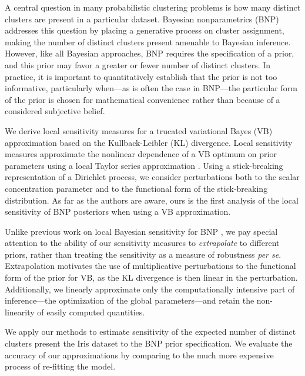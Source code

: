 
A central question in many probabilistic clustering problems is how many
distinct clusters are present in a particular dataset. Bayesian nonparametrics
(BNP) addresses this question by placing a generative process on cluster
assignment, making the number of distinct clusters present amenable to Bayesian
inference.  However, like all Bayesian approaches, BNP requires the
specification of a prior, and this prior may favor a greater or fewer number of
distinct clusters. In practice, it is important to quantitatively establish that
the prior is not too informative, particularly when---as is often the case in
BNP---the particular form of the prior is chosen for mathematical convenience
rather than because of a considered subjective belief.

We derive local sensitivity measures for a trucated variational Bayes (VB)
approximation based on the Kullback-Leibler (KL) divergence. Local sensitivity
measures approximate the nonlinear dependence of a VB optimum on prior
parameters using a local Taylor series approximation
\citep{gustafson:1996:localposterior, giordano:2017:covariances}. Using a
stick-breaking representation of a Dirichlet process, we consider perturbations
both to the scalar concentration parameter and to the functional form of the
stick-breaking distribution. As far as the authors are aware, ours is the first
analysis of the local sensitivity of BNP posteriors when using a VB
approximation.

Unlike previous work on local Bayesian sensitivity for BNP
\citep{Basu:2000:BNP_robustness}, we pay special attention to the ability of our
sensitivity measures to \emph{extrapolate} to different priors, rather than
treating the sensitivity as a measure of robustness \textit{per se}.
Extrapolation motivates the use of multiplicative perturbations to the
functional form of the prior for VB, as the KL divergence is then linear in the
perturbation. Additionally, we linearly approximate only the computationally
intensive part of inference---the optimization of the global parameters---and
retain the non-linearity of easily computed quantities.

We apply our methods to estimate sensitivity of the expected number of distinct
clusters present the Iris dataset \citep{iris_data_anderson, iris_data_fisher}
to the BNP prior specification.  We evaluate the accuracy of our approximations
by comparing to the much more expensive process of re-fitting the model.
